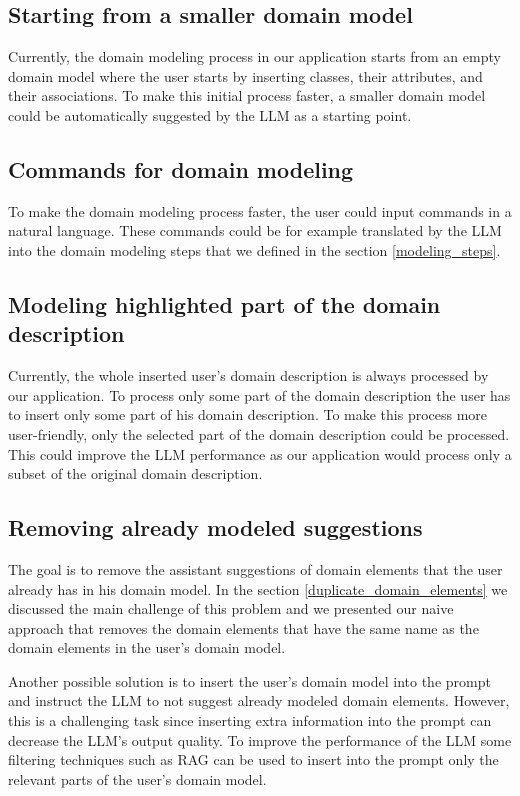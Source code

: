 \subsection{Starting from a smaller domain model}

Currently, the domain modeling process in our application starts from an empty domain model where the user starts by inserting classes, their attributes, and their associations. To make this initial process faster, a smaller domain model could be automatically suggested by the LLM as a starting point.


\subsection{Commands for domain modeling}

To make the domain modeling process faster, the user could input commands in a natural language. These commands could be for example translated by the LLM into the domain modeling steps that we defined in the section \ref{modeling_steps}.


\subsection{Modeling highlighted part of the domain description}

Currently, the whole inserted user's domain description is always processed by our application. To process only some part of the domain description the user has to insert only some part of his domain description. To make this process more user-friendly, only the selected part of the domain description could be processed. This could improve the LLM performance as our application would process only a subset of the original domain description.


\subsection{Removing already modeled suggestions}

The goal is to remove the assistant suggestions of domain elements that the user already has in his domain model. In the section \ref{duplicate_domain_elements} we discussed the main challenge of this problem and we presented our naive approach that removes the domain elements that have the same name as the domain elements in the user's domain model.

Another possible solution is to insert the user's domain model into the prompt and instruct the LLM to not suggest already modeled domain elements. However, this is a challenging task since inserting extra information into the prompt can decrease the LLM's output quality. To improve the performance of the LLM some filtering techniques such as RAG can be used to insert into the prompt only the relevant parts of the user's domain model.


